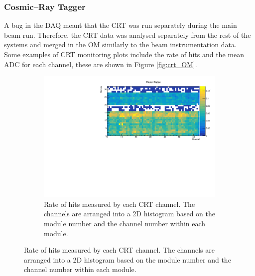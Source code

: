 \subsubsection*{Cosmic--Ray Tagger}
A bug in the DAQ meant that the CRT was run separately during the main beam 
run. Therefore, the CRT data was analysed separately from the rest of the 
\protodune{} systems and merged in the OM similarly to the beam instrumentation 
data. Some examples of CRT monitoring plots include the rate of hits and the
mean ADC for each channel, these are shown in Figure \ref{fig:crt_OM}.

\begin{figure}

	\centering

	\begin{subfigure}[b]{0.8\textwidth}
		\centering
		\vspace{3mm}
		\includegraphics[width=\textwidth]{figures/crt_rate_om.pdf}
		\caption {Rate of hits measured by each CRT channel. The channels are
		arranged into a 2D histogram based on the module number and the channel
		number within each module.}
		\label{fig:crt_rate_om}
	\end{subfigure}


\end{figure}
